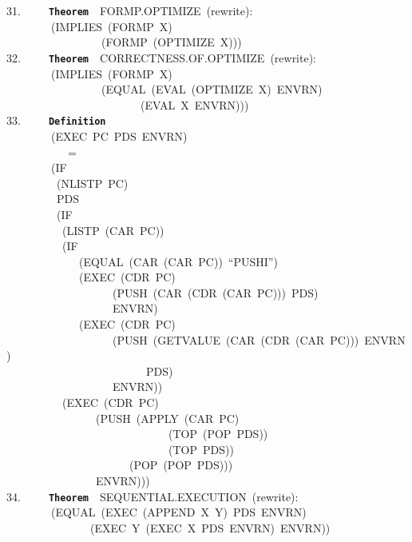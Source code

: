 \documentclass[11pt]{book}
\newenvironment{pubasis}{\begin{flushleft}\ttfamily\small}{\normalsize\rmfamily\end{flushleft}}
\newcommand{\axiomordefinition}[1]{\vspace{6pt}\texttt{\textbf{#1}}}
\begin{document}
\begin{pubasis}
31.~~~~~\axiomordefinition{Theorem}~~FORMP.OPTIMIZE~(rewrite):\\
~~~~~~~~(IMPLIES~(FORMP~X)\\
~~~~~~~~~~~~~~~~~(FORMP~(OPTIMIZE~X)))\\

32.~~~~~\axiomordefinition{Theorem}~~CORRECT\-NESS.OF.OPTIMIZE~(rewrite):\\
~~~~~~~~(IMPLIES~(FORMP~X)\\
~~~~~~~~~~~~~~~~~(EQUAL~(EVAL~(OPTIMIZE~X)~ENVRN)\\
~~~~~~~~~~~~~~~~~~~~~~~~(EVAL~X~ENVRN)))\\

33.~~~~~\axiomordefinition{Definition}\\
~~~~~~~~(EXEC~PC~PDS~ENVRN)\\
~~~~~~~~~~~=\\
~~~~~~~~(IF\\
~~~~~~~~~(NLISTP~PC)\\
~~~~~~~~~PDS\\
~~~~~~~~~(IF\\
~~~~~~~~~~(LISTP~(CAR~PC))\\
~~~~~~~~~~(IF\\
~~~~~~~~~~~~~(EQUAL~(CAR~(CAR~PC))~``PUSHI'')\\
~~~~~~~~~~~~~(EXEC~(CDR~PC)\\
~~~~~~~~~~~~~~~~~~~(PUSH~(CAR~(CDR~(CAR~PC)))~PDS)\\
~~~~~~~~~~~~~~~~~~~ENVRN)\\
~~~~~~~~~~~~~(EXEC~(CDR~PC)\\
~~~~~~~~~~~~~~~~~~~(PUSH~(GETVALUE~(CAR~(CDR~(CAR~PC)))~ENVRN)\\
~~~~~~~~~~~~~~~~~~~~~~~~~PDS)\\
~~~~~~~~~~~~~~~~~~~ENVRN))\\
~~~~~~~~~~(EXEC~(CDR~PC)\\
~~~~~~~~~~~~~~~~(PUSH~(APPLY~(CAR~PC)\\
~~~~~~~~~~~~~~~~~~~~~~~~~~~~~(TOP~(POP~PDS))\\
~~~~~~~~~~~~~~~~~~~~~~~~~~~~~(TOP~PDS))\\
~~~~~~~~~~~~~~~~~~~~~~(POP~(POP~PDS)))\\
~~~~~~~~~~~~~~~~ENVRN)))\\

34.~~~~~\axiomordefinition{Theorem}~~SEQUENTIAL.EXECUTION~(rewrite):\\
~~~~~~~~(EQUAL~(EXEC~(APPEND~X~Y)~PDS~ENVRN)\\
~~~~~~~~~~~~~~~(EXEC~Y~(EXEC~X~PDS~ENVRN)~ENVRN))\\


\end{pubasis}
\end{document}
